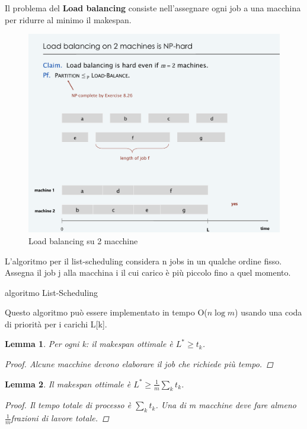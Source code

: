 \documentclass{article}
\newtheorem{lemma}{Lemma}[subsection]
\begin{document}
\noindent Il problema del \textbf{Load balancing} consiste nell'assegnare ogni job a una macchina per ridurre al minimo il makespan.
\begin{figure}[H]
    \centering
    \includegraphics[width=0.5\linewidth]{LoadBalancing_NP-hard.png}
    \caption{Load balancing su 2 macchine}
    \label{fig:enter-label}
\end{figure}
\noindent L'algoritmo per il list-scheduling considera n jobs in un qualche ordine fisso. Assegna il job j alla macchina i il cui carico è più piccolo fino a quel momento.
\begin{center}
\begin{algorithm}
\caption{algoritmo List-Scheduling}
\end{algorithm}
\end{center}
\noindent Questo algoritmo può essere implementato in tempo O($n\log m$) usando una coda di priorità per i carichi L[k].

\begin{lemma}
    Per ogni k: il makespan ottimale è $L^*\geq t_k$.
    \begin{proof}
        Alcune macchine devono elaborare il job che richiede più tempo.
    \end{proof}
\end{lemma}
\begin{lemma}
    Il makespan ottimale è $L^*\geq \frac{1}{m}\sum_kt_k$.
    \begin{proof}
        Il tempo totale di processo è $\sum_kt_k$. Una di m macchine deve fare almeno $\frac{1}{m}$frazioni di lavore totale.
    \end{proof}
\end{lemma}
\end{document}
